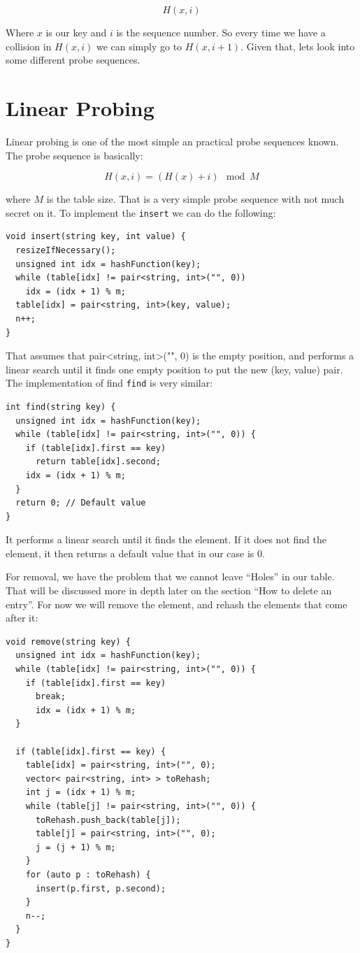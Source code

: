\[ H(x, i) \]

Where \( x \) is our key and \( i \) is the sequence number. So every time we have a collision in \( H(x, i) \) we can simply go to \( H(x, i + 1) \). Given that, lets look into some different probe sequences.

\section{Linear Probing}

Linear probing is one of the most simple an practical probe sequences known. The probe sequence is basically:

\[ H(x, i) = (H(x) + i) \mod M \]

where \( M \) is the table size. That is a very simple probe sequence with not much secret on it. To implement the \texttt{insert} we can do the following:

\begin{lstlisting}
void insert(string key, int value) {
  resizeIfNecessary();
  unsigned int idx = hashFunction(key);
  while (table[idx] != pair<string, int>("", 0))
    idx = (idx + 1) % m;      
  table[idx] = pair<string, int>(key, value);
  n++;
}
\end{lstlisting}

That assumes that pair<string, int>("", 0) is the empty position, and performs a linear search until it finds one empty position to put the new (key, value) pair. The implementation of find \texttt{find} is very similar:

\newpage

\begin{lstlisting}
int find(string key) {
  unsigned int idx = hashFunction(key);
  while (table[idx] != pair<string, int>("", 0)) {
    if (table[idx].first == key) 
      return table[idx].second;
    idx = (idx + 1) % m;
  }
  return 0; // Default value
}
\end{lstlisting}

It performs a linear search until it finds the element. If it does not find the element, it then returns a default value that in our case is 0. 

For removal, we have the problem that we cannot leave ``Holes'' in our table. That will be discussed more in depth later on the section ``How to delete an entry''. For now we will remove the element, and rehash the elements that come after it:

\begin{lstlisting}
void remove(string key) {
  unsigned int idx = hashFunction(key);
  while (table[idx] != pair<string, int>("", 0)) {
    if (table[idx].first == key) 
      break;
      idx = (idx + 1) % m;
  }
    
  if (table[idx].first == key) {
    table[idx] = pair<string, int>("", 0);
    vector< pair<string, int> > toRehash;
    int j = (idx + 1) % m;
    while (table[j] != pair<string, int>("", 0)) {
      toRehash.push_back(table[j]);
      table[j] = pair<string, int>("", 0);
      j = (j + 1) % m;
    }
    for (auto p : toRehash) {
      insert(p.first, p.second);
    }
    n--;
  }  
}
\end{lstlisting}

